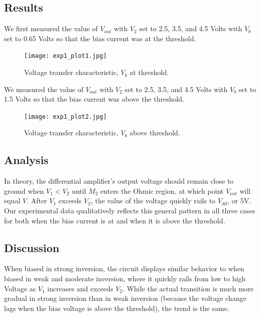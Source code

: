 \documentclass{article}
\begin{document}
\subsection{Results}
We first measured the value of $V_{out}$ with $V_2$ set to 2.5, 3.5, and 4.5 Volts with $V_b$ set to 0.65 Volts so that the bias current was at the threshold.
\begin{figure}[H]
  \begin{center}      
  \texttt{[image: exp1\_plot1.jpg]}
  \caption{Voltage transfer characteristic, $V_b$ at threshold.}   
  \label{fig:exp1_plot1}
  \end{center}
\end{figure}
We measured the value of $V_{out}$ with $V_2$ set to 2.5, 3.5, and 4.5 Volts with $V_b$ set to 1.5 Volts so that the bias current was above the threshold.
\begin{figure}[H]
  \begin{center}      
  \texttt{[image: exp1\_plot2.jpg]}
  \caption{Voltage transfer characteristic, $V_b$ above  threshold.}   
  \label{fig:exp1_plot2}
  \end{center}
\end{figure}
\subsection{Analysis}
In theory, the differential amplifier's output voltage should remain close to ground when $V_1 < V_2$ until $M_2$ enters the Ohmic region, at which point $V_{out}$ will equal $V$. After $V_1$ exceeds $V_2$, the value of the voltage quickly rails to $V_{dd}$, or 5V.
Our experimental data qualitatively reflects this general pattern in all three cases for both when the bias current is at and when it is above the threshold.  

\subsection{Discussion}
When biased in strong inversion, the circuit displays similar behavior to when biased in weak and moderate inversion, where it quickly rails from low to high Voltage as $V_1$ increases and exceeds $V_2$. While the actual transition is much more gradual in strong inversion than in weak inversion (because the voltage change lags when the bias voltage is above the threshold), the trend is the same. 
\end{document}
